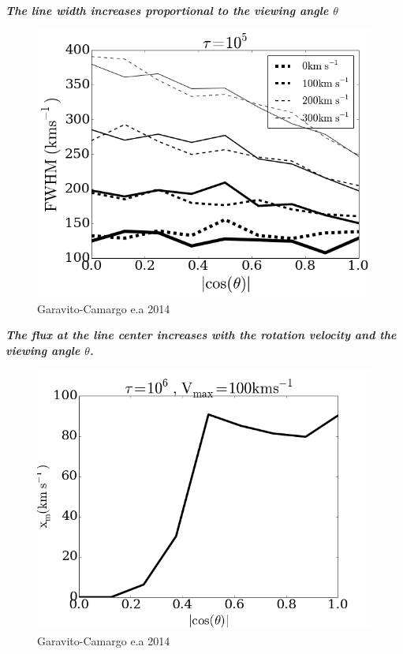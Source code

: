 \documentclass{beamer}
\begin{document}
\begin{frame}{\textit{\textbf{The line width increases proportional to the viewing angle $\theta$}}}
\begin{figure}
\includegraphics[scale=0.4]{Figures/f6.png}
\caption*{Garavito-Camargo e.a 2014}
\end{figure}
\end{frame}

\begin{frame}{\textit{\textbf{The flux at the line center increases with the rotation velocity and the viewing angle $\theta$.}}}
\begin{figure}
\includegraphics[scale=0.4]{Figures/f8.png}
\caption*{Garavito-Camargo e.a 2014}
\end{figure}
\end{frame}
\end{document}
